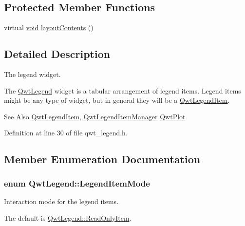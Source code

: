 \subsection*{Protected Member Functions}
\begin{DoxyCompactItemize}
\item 
virtual \hyperlink{group___u_a_v_objects_plugin_ga444cf2ff3f0ecbe028adce838d373f5c}{void} \hyperlink{class_qwt_legend_ac44118481db62143950a7c74bc2832ab}{layout\-Contents} ()
\end{DoxyCompactItemize}


\subsection{Detailed Description}
The legend widget. 

The \hyperlink{class_qwt_legend}{Qwt\-Legend} widget is a tabular arrangement of legend items. Legend items might be any type of widget, but in general they will be a \hyperlink{class_qwt_legend_item}{Qwt\-Legend\-Item}.

\begin{DoxySeeAlso}{See Also}
\hyperlink{class_qwt_legend_item}{Qwt\-Legend\-Item}, \hyperlink{class_qwt_legend_item_manager}{Qwt\-Legend\-Item\-Manager} \hyperlink{class_qwt_plot}{Qwt\-Plot} 
\end{DoxySeeAlso}


Definition at line 30 of file qwt\-\_\-legend.\-h.



\subsection{Member Enumeration Documentation}
\hypertarget{class_qwt_legend_ab216dd2dba9ebf6cb0ed2dd621a652e0}{
\subsubsection[{Legend\-Item\-Mode}]{\setlength{\rightskip}{0pt plus 5cm}enum {\bf Qwt\-Legend\-::\-Legend\-Item\-Mode}}}\label{class_qwt_legend_ab216dd2dba9ebf6cb0ed2dd621a652e0}


Interaction mode for the legend items. 

The default is \hyperlink{class_qwt_legend_ab216dd2dba9ebf6cb0ed2dd621a652e0a82869bcd75310e861ae9257677185186}{Qwt\-Legend\-::\-Read\-Only\-Item}.

